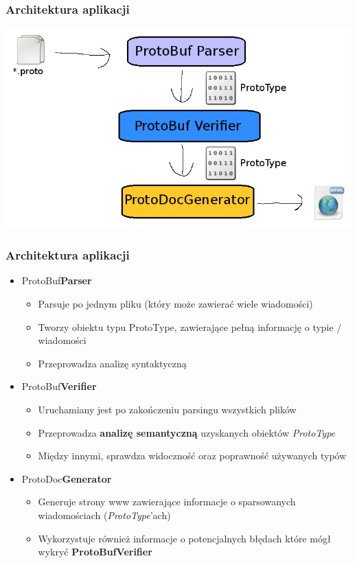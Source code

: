 \documentclass{beamer}
\begin{document}
\begin{frame}[fragile]
\frametitle{Architektura aplikacji}
\begin{center}
 \includegraphics[scale = 0.45]{protodoc_flow}
\end{center}
\end{frame}



\begin{frame}[fragile]
\frametitle{Architektura aplikacji}
\begin{itemize}
 \item ProtoBuf\textbf{Parser}
 \begin{itemize}
  \item Parsuje po jednym pliku (który może zawierać wiele wiadomości)
  \item Tworzy obiektu typu ProtoType, zawierające pełną informację o typie / wiadomości
  \item Przeprowadza analizę syntaktyczną
 \end{itemize}

 \pause \item ProtoBuf\textbf{Verifier}
 \begin{itemize}
  \item Uruchamiany jest po zakończeniu parsingu wszystkich plików
  \item Przeprowadza \textbf{analizę semantyczną} uzyskanych obiektów \textit{ProtoType}
  \item Między innymi, sprawdza widoczność oraz poprawność używanych typów
 \end{itemize}

 \pause \item ProtoDoc\textbf{Generator}
 \begin{itemize}
  \item Generuje strony www zawierające informacje o sparsowanych wiadomościach (\textit{ProtoType}'ach)
  \item Wykorzystuje również informacje o potencjalnych błędach które mógł wykryć \textbf{ProtoBufVerifier}
 \end{itemize}

\end{itemize}

\end{frame}
\end{document}
